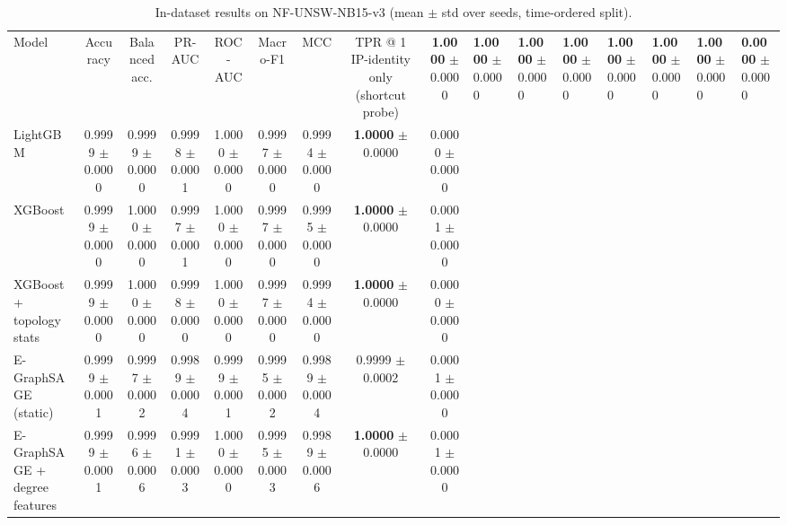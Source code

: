 \begin{table}[t]
\centering
\caption{In-dataset results on NF-UNSW-NB15-v3 (mean $\pm$ std over seeds, time-ordered split).}
\begin{tabular}{lcccccccc}
\toprule
Model & Accuracy & Balanced acc. & PR-AUC & ROC-AUC & Macro-F1 & MCC & TPR @ 1%
\midrule
IP-identity only (shortcut probe) & \textbf{1.0000} {\scriptsize $\pm$ 0.0000} & \textbf{1.0000} {\scriptsize $\pm$ 0.0000} & \textbf{1.0000} {\scriptsize $\pm$ 0.0000} & \textbf{1.0000} {\scriptsize $\pm$ 0.0000} & \textbf{1.0000} {\scriptsize $\pm$ 0.0000} & \textbf{1.0000} {\scriptsize $\pm$ 0.0000} & \textbf{1.0000} {\scriptsize $\pm$ 0.0000} & \textbf{0.0000} {\scriptsize $\pm$ 0.0000} \\
LightGBM & 0.9999 {\scriptsize $\pm$ 0.0000} & 0.9999 {\scriptsize $\pm$ 0.0000} & 0.9998 {\scriptsize $\pm$ 0.0001} & 1.0000 {\scriptsize $\pm$ 0.0000} & 0.9997 {\scriptsize $\pm$ 0.0000} & 0.9994 {\scriptsize $\pm$ 0.0000} & \textbf{1.0000} {\scriptsize $\pm$ 0.0000} & 0.0000 {\scriptsize $\pm$ 0.0000} \\
XGBoost & 0.9999 {\scriptsize $\pm$ 0.0000} & 1.0000 {\scriptsize $\pm$ 0.0000} & 0.9997 {\scriptsize $\pm$ 0.0001} & 1.0000 {\scriptsize $\pm$ 0.0000} & 0.9997 {\scriptsize $\pm$ 0.0000} & 0.9995 {\scriptsize $\pm$ 0.0000} & \textbf{1.0000} {\scriptsize $\pm$ 0.0000} & 0.0001 {\scriptsize $\pm$ 0.0000} \\
XGBoost + topology stats & 0.9999 {\scriptsize $\pm$ 0.0000} & 1.0000 {\scriptsize $\pm$ 0.0000} & 0.9998 {\scriptsize $\pm$ 0.0000} & 1.0000 {\scriptsize $\pm$ 0.0000} & 0.9997 {\scriptsize $\pm$ 0.0000} & 0.9994 {\scriptsize $\pm$ 0.0000} & \textbf{1.0000} {\scriptsize $\pm$ 0.0000} & 0.0000 {\scriptsize $\pm$ 0.0000} \\
E-GraphSAGE (static) & 0.9999 {\scriptsize $\pm$ 0.0001} & 0.9997 {\scriptsize $\pm$ 0.0002} & 0.9989 {\scriptsize $\pm$ 0.0004} & 0.9999 {\scriptsize $\pm$ 0.0001} & 0.9995 {\scriptsize $\pm$ 0.0002} & 0.9989 {\scriptsize $\pm$ 0.0004} & 0.9999 {\scriptsize $\pm$ 0.0002} & 0.0001 {\scriptsize $\pm$ 0.0000} \\
E-GraphSAGE + degree features & 0.9999 {\scriptsize $\pm$ 0.0001} & 0.9996 {\scriptsize $\pm$ 0.0006} & 0.9991 {\scriptsize $\pm$ 0.0003} & 1.0000 {\scriptsize $\pm$ 0.0000} & 0.9995 {\scriptsize $\pm$ 0.0003} & 0.9989 {\scriptsize $\pm$ 0.0006} & \textbf{1.0000} {\scriptsize $\pm$ 0.0000} & 0.0001 {\scriptsize $\pm$ 0.0000} \\

\end{tabular}
\end{table}

